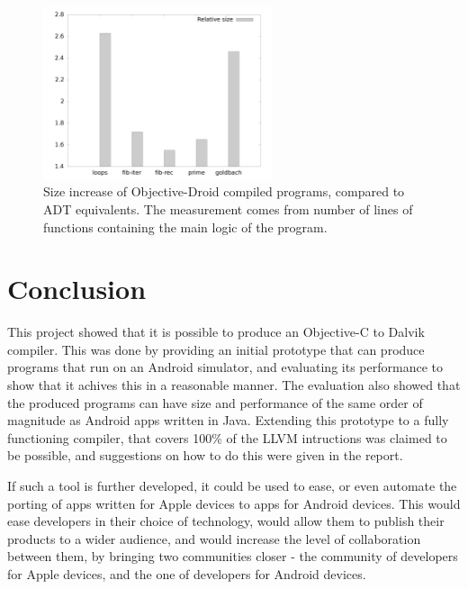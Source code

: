 \documentclass[parskip]{cs4rep}
\begin{document}
\begin{figure}[htb]
    \centering
        \includegraphics[width=0.6\textwidth]{size}
    \caption{Size increase of Objective-Droid compiled programs, compared to ADT equivalents. The measurement comes from number of lines of functions containing the main logic of the program.}
    \label{fig:size}
\end{figure}

\chapter{Conclusion}

This project showed that it is possible to produce an Objective-C to Dalvik compiler. This was done by providing an initial prototype that can produce programs that run on an Android simulator, and evaluating its performance to show that it achives this in a reasonable manner. The evaluation also showed that the produced programs can have size and performance of the same order of magnitude as Android apps written in Java. Extending this prototype to a fully functioning compiler, that covers 100\% of the LLVM intructions was claimed to be possible, and suggestions on how to do this were given in the report.

If such a tool is further developed, it could be used to ease, or even automate the porting of apps written for Apple devices to apps for Android devices. This would ease developers in their choice of technology, would allow them to publish their products to a wider audience, and would increase the level of collaboration between them, by bringing two communities closer - the community of developers for Apple devices, and the one of developers for Android devices.



\end{document}
